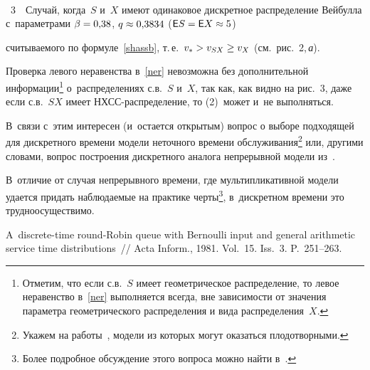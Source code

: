 \begin{multicols}{2}

  { \begin{center}  %
 \vspace*{-6pt}
 \mbox{%
 \epsfxsize=78.7mm 
 }

\end{center}

\vspace*{-6pt}

\noindent
{{\figurename~3}\ \ \small{Случай, когда~$S$ и~$X$ имеют одинаковое дискретное распределение Вейбулла
с~параметрами $\beta\hm=0{,}38$, $q \hm\approx 0{,}3834$ ($\mathsf{E}S\hm=\mathsf{E}X
\hm \approx 5$)}}
}


\addtocounter{figure}{1}




\noindent
считываемого по формуле~\eqref{shassb}, т.\,е.\
 $v_* \hm> v_{SX} \hm\ge v_{X}$ (см.\ рис.~2,\,\textit{а}).



Проверка левого неравенства в~\eqref{ner} невозможна без
дополнительной информации\footnote{Отметим, что
если с.в.~$S$ имеет геометрическое распределение,
то левое неравенство в~\eqref{ner} выполняется всегда,
вне зависимости от значения параметра геометрического распределения
и вида распределения~$X$.}
о~распределениях с.в.~$S$ и~$X$, так как, как видно на рис.~3,
даже если с.в.~$SX$ имеет НХСС-рас\-пре\-де\-ле\-ние, то
(2)~может и~не выполняться.
 
 В~связи с~этим интересен (и~остается открытым) вопрос о выборе подходящей для дискретного времени
модели неточного времени обслуживания\footnote{Укажем на работы~\cite{sx1,sx2}, 
модели из которых могут оказаться плодотворными.}
или, другими словами, вопрос построения дискретного аналога непрерывной 
модели из~\cite{Mat-2}.

В~отличие от случая непрерывного времени, где мультипликативной модели 
удается придать наблюдаемые
на практике черты\footnote{Более подробное обсуждение этого вопроса 
можно найти в~\cite[Secion 6.3]{Mat}.},
в~дискретном времени это трудноосуществимо.

{\small\frenchspacing
 {%
 \begin{thebibliography}{99}

A~discrete-time round-Robin queue with Bernoulli input
and general arithmetic service time distributions~//
Acta Inform., 1981. Vol.~15. Iss.~3. P.~251--263.



\end{thebibliography}}}
\end{multicols}
